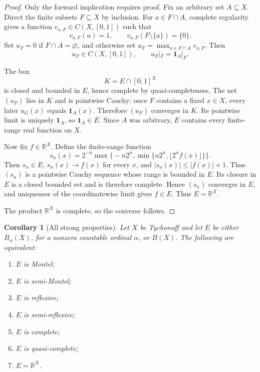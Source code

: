 \documentclass[11pt]{article}
\newtheorem{corollary}[theorem]{Corollary}
\newcommand{\R}{\mathbb{R}}
\begin{document}
\begin{proof}
Only the forward implication requires proof.  Fix an arbitrary set
$A\subseteq X$.  Direct the finite subsets $F\subseteq X$ by inclusion.
For $a\in F\cap A$, complete regularity gives a function
$v_{a,F}\in C(X,[0,1])$ such that
\[
 v_{a,F}(a)=1,
 \qquad v_{a,F}(F\setminus\{a\})=\{0\}.
\]
Set $u_F=0$ if $F\cap A=\varnothing$, and otherwise set
$u_F=\max_{a\in F\cap A}v_{a,F}$.  Then
\[
 u_F\in C(X,[0,1]),
 \qquad u_F|_F=\mathbf 1_A|_F.
\]

The box
\[
 K=E\cap[0,1]^X
\]
is closed and bounded in $E$, hence complete by quasi-completeness.  The net
$(u_F)$ lies in $K$ and is pointwise Cauchy: once $F$ contains a fixed
$x\in X$, every later $u_G(x)$ equals $\mathbf 1_A(x)$.  Therefore $(u_F)$
converges in $K$.  Its pointwise limit is uniquely $\mathbf 1_A$, so
$\mathbf 1_A\in E$.  Since $A$ was arbitrary, $E$ contains every finite-range
real function on $X$.

Now fix $f\in\R^X$.  Define the finite-range function
\[
 s_n(x)=2^{-n}\max\bigl\{-n2^n,
           \min\{n2^n,\lfloor 2^n f(x)\rfloor\}\bigr\}.
\]
Then $s_n\in E$, $s_n(x)\to f(x)$ for every $x$, and
$|s_n(x)|\leq |f(x)|+1$.  Thus $(s_n)$ is a pointwise Cauchy sequence whose
range is bounded in $E$.  Its closure in $E$ is a closed bounded set and is
therefore complete.  Hence $(s_n)$ converges in $E$, and uniqueness of the
coordinatewise limit gives $f\in E$.  Thus $E=\R^X$.

The product $\R^X$ is complete, so the converse follows.
\end{proof}

\begin{corollary}[All strong properties]\label{cor:strong}
Let $X$ be Tychonoff and let $E$ be either $B_\alpha(X)$, for a nonzero
countable ordinal $\alpha$, or $B(X)$.  The following are equivalent:
\begin{enumerate}
\item $E$ is Montel;
\item $E$ is semi-Montel;
\item $E$ is reflexive;
\item $E$ is semi-reflexive;
\item $E$ is complete;
\item $E$ is quasi-complete;
\item $E=\R^X$.
\end{enumerate}
\end{corollary}
\end{document}
